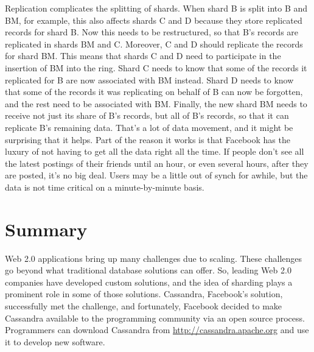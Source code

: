 Replication complicates the splitting of shards.
When shard B is split into B and BM, for example, this also affects shards C and D
because they store replicated records for shard B.
Now this needs to be restructured, so that B's records are replicated in shards BM and C.
Moreover, C and D should replicate the records for shard BM.
This means that shards C and D need
to participate in the insertion of BM into the ring.
Shard C needs to know that some of the records
it replicated for B are now associated with BM instead.
Shard D needs to know that some of the records it was replicating
on behalf of B can now be forgotten, and the rest need to be associated with BM.
Finally, the new shard BM needs to receive not just its share
of B's records, but all of B's records, so that it can replicate B's remaining data.
That's a lot of data movement, and it might be surprising that it helps.
Part of the reason it works is that Facebook has the luxury of not having
to get all the data right all the time.
If people don't see all the latest postings of their friends until
an hour, or even several hours, after they are posted, it's no big deal.
Users may be a little out of synch for awhile, but the data is not time critical
on a minute-by-minute basis.

\section{Summary}

Web 2.0 applications bring up many challenges due to scaling.
These challenges go beyond what traditional database solutions can offer.
So, leading Web 2.0 companies have developed custom solutions,
and the idea of sharding plays a prominent role in some of those solutions.
Cassandra, Facebook's solution, successfully met the challenge, and
fortunately, Facebook decided to make Cassandra available to the
programming community via an open source process.
Programmers can download Cassandra from \url{http://cassandra.apache.org}
and use it to develop new software.

